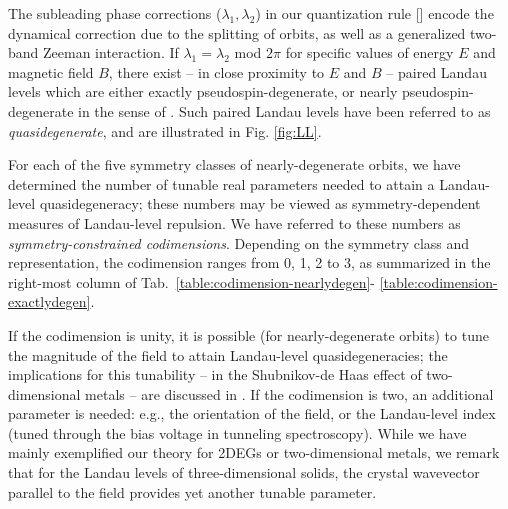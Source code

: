 \documentclass[aps, showpacs, twocolumn, notitlepage, superscriptaddress]{revtex4-1}
\begin{document}
The subleading phase corrections ($\lambda_1,\lambda_2$) in our quantization rule  [] encode the dynamical correction due to the splitting of  orbits, as well as a generalized two-band Zeeman interaction. If $\lambda_1{=}\lambda_2$ mod $2\pi$ for specific values of energy $E$ and magnetic field $B$, there exist -- in close proximity to $E$ and $B$ --    paired Landau levels which are either exactly pseudospin-degenerate, or nearly pseudospin-degenerate in the sense of . Such paired Landau levels have been referred to as \textit{quasidegenerate}, and are illustrated in Fig. \ref{fig:LL}.

For each of the five symmetry classes of nearly-degenerate orbits, we have determined the number of tunable real parameters needed to attain a Landau-level quasidegeneracy; these numbers may be viewed as symmetry-dependent measures of Landau-level repulsion. We have referred to these numbers as \textit{symmetry-constrained codimensions}. Depending on the symmetry class and representation, the codimension ranges from 0, 1, 2 to 3, as summarized in the right-most column of Tab.\ \ref{table:codimension-nearlydegen}- \ref{table:codimension-exactlydegen}.

If the codimension is unity, it is possible (for nearly-degenerate orbits) to tune the magnitude of the field to attain Landau-level quasidegeneracies; the implications for this tunability -- in the Shubnikov-de Haas effect of two-dimensional metals -- are discussed in . If the codimension is two, an additional parameter is needed: e.g., the orientation of the field\cite{yakovenko_angular_2006}, or the Landau-level index (tuned through the bias voltage in tunneling spectroscopy\cite{Sangjun_Cd3As2,Ilija_SnTe,kushwaha_Dirac}). While we have mainly exemplified our theory for 2DEGs or two-dimensional metals, we remark that for the Landau levels of three-dimensional solids, the crystal wavevector parallel to the field provides yet another tunable parameter.
\end{document}
